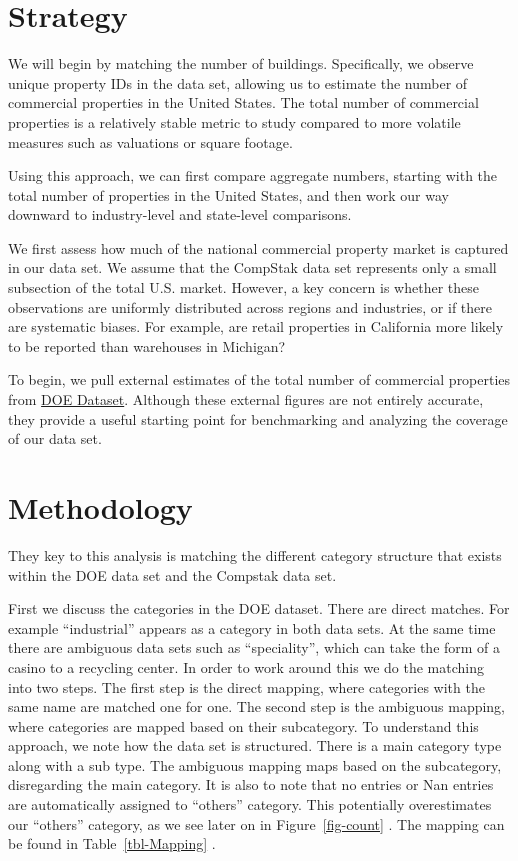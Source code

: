 \documentclass[
  12pt]{article}
\begin{document}
\section{Strategy}\label{strategy}

We will begin by matching the number of buildings. Specifically, we
observe unique property IDs in the data set, allowing us to estimate the
number of commercial properties in the United States. The total number
of commercial properties is a relatively stable metric to study compared
to more volatile measures such as valuations or square footage.

Using this approach, we can first compare aggregate numbers, starting
with the total number of properties in the United States, and then work
our way downward to industry-level and state-level comparisons.

We first assess how much of the national commercial property market is
captured in our data set. We assume that the CompStak data set
represents only a small subsection of the total U.S. market. However, a
key concern is whether these observations are uniformly distributed
across regions and industries, or if there are systematic biases. For
example, are retail properties in California more likely to be reported
than warehouses in Michigan?

To begin, we pull external estimates of the total number of commercial
properties from
\href{https://catalog.data.gov/dataset/city-and-county-commercial-building-inventories-010d2}{DOE
Dataset}. Although these external figures are not entirely accurate,
they provide a useful starting point for benchmarking and analyzing the
coverage of our data set.

\section{Methodology}\label{methodology}

They key to this analysis is matching the different category structure
that exists within the DOE data set and the Compstak data set.

First we discuss the categories in the DOE dataset. There are direct
matches. For example ``industrial'' appears as a category in both data
sets. At the same time there are ambiguous data sets such as
``speciality'', which can take the form of a casino to a recycling
center. In order to work around this we do the matching into two steps.
The first step is the direct mapping, where categories with the same
name are matched one for one. The second step is the ambiguous mapping,
where categories are mapped based on their subcategory. To understand
this approach, we note how the data set is structured. There is a main
category type along with a sub type. The ambiguous mapping maps based on
the subcategory, disregarding the main category. It is also to note that
no entries or Nan entries are automatically assigned to ``others''
category. This potentially overestimates our ``others'' category, as we
see later on in Figure~\ref{fig-count} . The mapping can be found in
Table~\ref{tbl-Mapping} .
\end{document}
